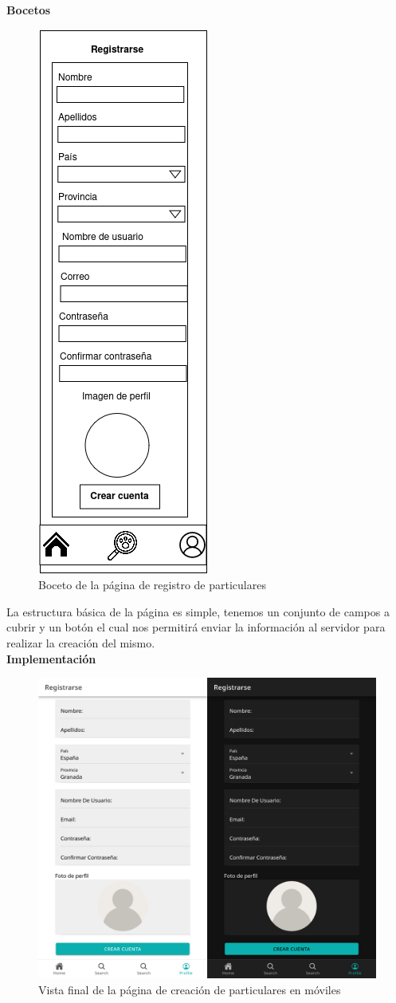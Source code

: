 \textbf{Bocetos}
\begin{figure}[H]
	\centering
	\includegraphics[width=0.31\linewidth]{"sprint 2/hu5/registro_particulares"}
	\caption{Boceto de la página de registro de particulares}
	\label{fig:registroparticulares}
\end{figure}

La estructura básica de la página es simple, tenemos un conjunto de campos a cubrir y un botón el cual nos permitirá enviar la información al servidor para realizar la creación del mismo. \\

\textbf{Implementación}

\begin{figure}[H]
	\centering
	\includegraphics[width=0.7\linewidth]{"sprint 2/hu5/impRegistroParticulares"}
	\caption{Vista final de la página de creación de particulares en móviles}
	\label{fig:impregistroparticulares}
\end{figure}

